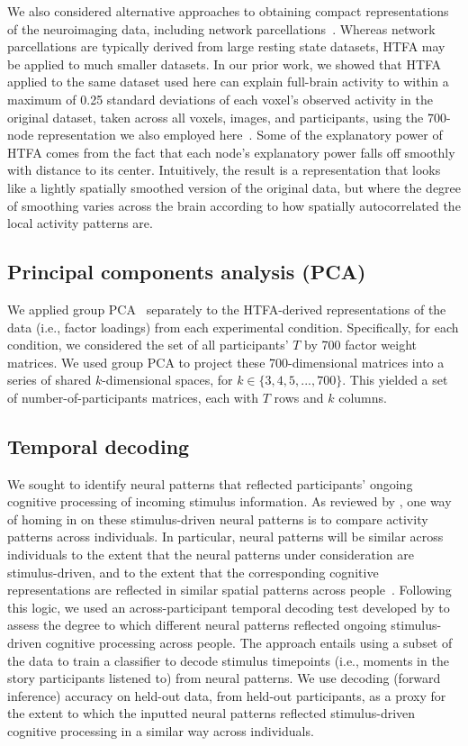 \documentclass[english, 11pt]{article}
\begin{document}
We also considered alternative approaches to obtaining compact representations
of the neuroimaging data, including network
parcellations~\citep[e.g.,][]{SchaEtal18, GordEtal16}. Whereas network
parcellations are typically derived from large resting state datasets, HTFA may
be applied to much smaller datasets. In our prior work, we showed that HTFA
applied to the same dataset used here can explain full-brain activity to within
a maximum of 0.25 standard deviations of each voxel's observed activity in the
original dataset, taken across all voxels, images, and participants, using the
700-node representation we also employed here~\citep{MannEtal18}. Some of the
explanatory power of HTFA comes from the fact that each node's explanatory
power falls off smoothly with distance to its center. Intuitively, the result
is a representation that looks like a lightly spatially smoothed version of the
original data, but where the degree of smoothing varies across the brain
according to how spatially autocorrelated the local activity patterns are.

\subsection*{Principal components analysis (PCA)}

We applied group PCA~\citep{SmitEtal14} separately to the HTFA-derived
representations of the data (i.e., factor loadings) from each experimental
condition. Specifically, for each condition, we considered the set of all
participants' $T$ by 700 factor weight matrices. We used group PCA to project
these 700-dimensional matrices into a series of shared $k$-dimensional spaces,
for $k \in \{3, 4, 5, ..., 700\}$. This yielded a set of number-of-participants
matrices, each with $T$ rows and $k$ columns.

\subsection*{Temporal decoding}

We sought to identify neural patterns that reflected participants' ongoing
cognitive processing of incoming stimulus information. As reviewed by
\cite{SimoEtal16}, one way of homing in on these stimulus-driven neural
patterns is to compare activity patterns across individuals. In particular,
neural patterns will be similar across individuals to the extent that the
neural patterns under consideration are stimulus-driven, and to the extent that
the corresponding cognitive representations are reflected in similar spatial
patterns across people~\citep{SimoChan20}. Following this logic, we used an
across-participant temporal decoding test developed by \cite{MannEtal18} to
assess the degree to which different neural patterns reflected ongoing
stimulus-driven cognitive processing across people. The approach entails using
a subset of the data to train a classifier to decode stimulus timepoints (i.e.,
moments in the story participants listened to) from neural patterns. We use
decoding (forward inference) accuracy on held-out data, from held-out
participants, as a proxy for the extent to which the inputted neural patterns
reflected stimulus-driven cognitive processing in a similar way across
individuals.
\end{document}

